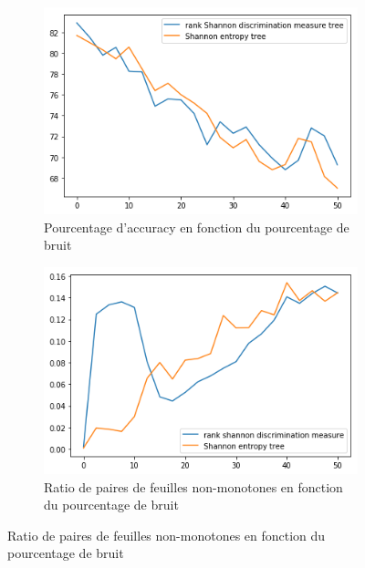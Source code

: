 \documentclass[a4paper]{article}
\begin{document}
\begin{figure}[H]
    \centering
    \begin{subfigure}[c]{0.46\textwidth}
        \centering
        \includegraphics[width=\textwidth]{images/cci_5.png}
        \caption{Pourcentage d'accuracy en fonction du pourcentage de bruit}
    \end{subfigure}
    \begin{subfigure}[c]{0.46\textwidth}
        \centering
        \includegraphics[width=\textwidth]{images/ratio_5.png}
        \caption{Ratio de paires de feuilles non-monotones en fonction du pourcentage de bruit}
    \end{subfigure}
    

\end{figure}
\end{document}
